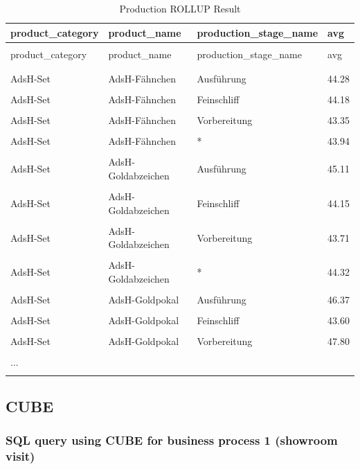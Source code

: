 \documentclass[letterpaper,12pt]{article}
\begin{document}
\begingroup
\renewcommand\arraystretch{0.5}
\begin{longtable}{p{4cm}p{4cm}p{4cm}p{4cm}}
        \caption{Production ROLLUP Result} \\
				product\_category & product\_name & production\_stage\_name & avg \\
        \endfirsthead \\
        product\_category & product\_name & production\_stage\_name & avg \\
        \endhead \\
				\hline \\
AdsH-Set & AdsH-Fähnchen & Ausführung & 44.28 \\
\hline \\
AdsH-Set & AdsH-Fähnchen & Feinschliff & 44.18 \\
\hline \\
AdsH-Set & AdsH-Fähnchen & Vorbereitung & 43.35 \\
\hline \\
AdsH-Set & AdsH-Fähnchen & * & 43.94 \\
\hline \\
AdsH-Set & AdsH-Goldabzeichen & Ausführung & 45.11 \\
\hline \\
AdsH-Set & AdsH-Goldabzeichen & Feinschliff & 44.15 \\
\hline \\
AdsH-Set & AdsH-Goldabzeichen & Vorbereitung & 43.71 \\
\hline \\
AdsH-Set & AdsH-Goldabzeichen & * & 44.32 \\
\hline \\
AdsH-Set & AdsH-Goldpokal & Ausführung & 46.37 \\
\hline \\
AdsH-Set & AdsH-Goldpokal & Feinschliff & 43.60 \\
\hline \\
AdsH-Set & AdsH-Goldpokal & Vorbereitung & 47.80 \\
\hline \\
... & & & \\
\hline \\
\end{longtable} 
\endgroup

\subsection{CUBE}

\subsubsection{SQL query using CUBE for business process 1 (showroom visit)}
\end{document}
